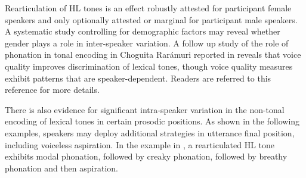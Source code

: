 \pagebreak
    \z
\z

Rearticulation of HL tones is an effect robustly attested for participant female speakers and only optionally attested or marginal for participant male speakers. A systematic study controlling for demographic factors may reveal whether gender plays a role in inter-speaker variation. A follow up study of the role of phonation in tonal encoding in Choguita Rarámuri reported in \citet{kubuzono2020raramuri} reveals that voice quality improves discrimination of lexical tones, though voice quality measures exhibit patterns that are speaker-dependent. Readers are referred to this reference for more details.

There is also evidence for significant intra-speaker variation in the non-tonal encoding of lexical tones in certain prosodic positions. As shown in the following examples, speakers may deploy additional strategies in utterance final position, including voiceless aspiration. In the example in , a rearticulated HL tone exhibits modal phonation, followed by creaky phonation, followed by breathy phonation and then aspiration.


